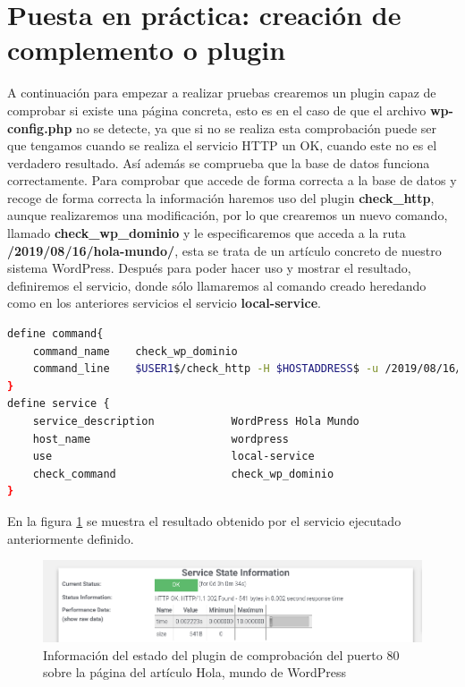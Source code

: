 \section{Puesta en práctica: creación de complemento o plugin}

A continuación para empezar a realizar pruebas crearemos un plugin capaz de comprobar si existe una página concreta, esto es en el caso de que el archivo \textbf{wp-config.php} no se detecte, ya que si no se realiza esta comprobación puede ser que tengamos cuando se realiza el servicio HTTP un OK, cuando este no es el verdadero resultado. Así además se comprueba que la base de datos funciona correctamente. Para comprobar que accede de forma correcta a la base de datos y recoge de forma correcta la información haremos uso del plugin \textbf{check\_http}, aunque realizaremos una modificación, por lo que crearemos un nuevo comando, llamado \textbf{check\_wp\_dominio} y le especificaremos que acceda a la ruta \textbf{/2019/08/16/hola-mundo/}, esta se trata de un artículo concreto de nuestro sistema WordPress.
\newpage
Después para poder hacer uso y mostrar el resultado, definiremos el servicio, donde sólo llamaremos al comando creado heredando como en los anteriores servicios el servicio \textbf{local-service}.

\begin{lstlisting}[language=bash]
define command{
	command_name    check_wp_dominio
	command_line    $USER1$/check_http -H $HOSTADDRESS$ -u /2019/08/16/hola-mundo/
}
define service {
	service_description            WordPress Hola Mundo
	host_name                      wordpress
	use                            local-service                       
	check_command                  check_wp_dominio
}
\end{lstlisting}
En la figura \ref{check_hola_mundo} se muestra el resultado obtenido por el servicio ejecutado anteriormente definido.
\begin{figure}[H]
	\centering
	\includegraphics[scale=0.3]{imagenes/wordpress/analisis_naemon/check_hola_mundo.png}
	\caption{Información del estado del plugin de comprobación del puerto 80 sobre la página del artículo Hola, mundo de WordPress} \label{check_hola_mundo}
\end{figure}

